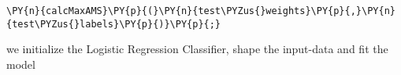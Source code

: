 
{\par%
\vspace{-1\baselineskip}%
}%
\begin{notebookcell}[]%
\begin{addmargin}[\cellleftmargin]{0em}%
{\smaller%
\par%
%
\vspace{-1\smallerfontscale}%
\begin{Verbatim}[commandchars=\\\{\}]
\PY{n}{calcMaxAMS}\PY{p}{(}\PY{n}{test\PYZus{}weights}\PY{p}{,}\PY{n}{test\PYZus{}labels}\PY{p}{)}\PY{p}{;}
\end{Verbatim}
%
\par%
\vspace{-1\smallerfontscale}}%
\end{addmargin}
\end{notebookcell}


    we initialize the Logistic Regression Classifier, shape the input-data
and fit the model


